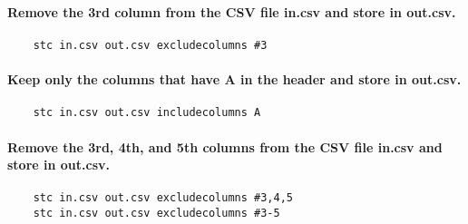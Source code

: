 \documentclass[11pt]{article}
\begin{document}
\paragraph{Remove the 3rd column from the CSV file in.csv and store in out.csv.}
\begin{verbatim}
    stc in.csv out.csv excludecolumns #3
\end{verbatim}
\paragraph{Keep only the columns that have A in the header and store in out.csv.}
\begin{verbatim}
    stc in.csv out.csv includecolumns A
\end{verbatim}
\paragraph{Remove the 3rd, 4th, and 5th columns from the CSV file in.csv and store in out.csv.}
\begin{verbatim}
    stc in.csv out.csv excludecolumns #3,4,5
    stc in.csv out.csv excludecolumns #3-5
\end{verbatim}
\end{document}
